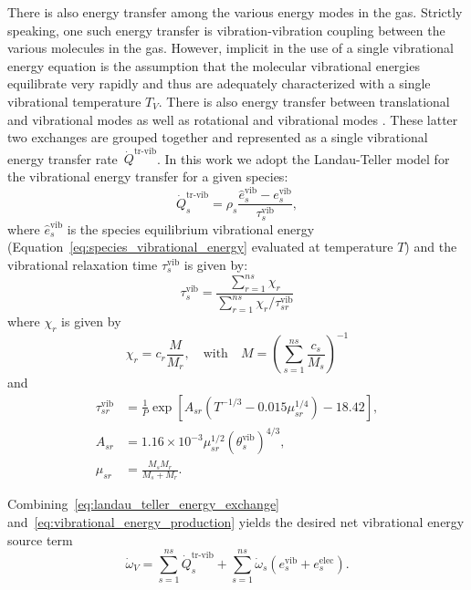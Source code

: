 \documentclass[10pt]{article}
\newcommand{\vib}{\text{vib}}
\begin{document}
There is also energy transfer among the various energy modes in the gas.  Strictly speaking, one such energy transfer is vibration-vibration coupling between the various molecules in the gas.  However, implicit in the use of a single vibrational energy equation is the assumption that the molecular vibrational energies equilibrate very rapidly and thus are adequately characterized with a single vibrational temperature $T_V$.  There is also energy transfer between translational and vibrational modes as well as rotational and vibrational modes \citep{Kirk2009}.  These latter two exchanges are grouped together and represented as a single vibrational energy transfer rate~$\dot{Q}^{\text{tr-vib}}$.  
In this work we adopt the Landau-Teller model for the vibrational energy transfer for a given species:
\begin{equation}
  \label{eq:landau_teller_energy_exchange}
  \dot{Q}^{\text{tr-vib}}_s = \rho_s \frac{\hat{e}^{\text{vib}}_{s} - e^{\text{vib}}_s}{\tau^{\text{vib}}_s},
\end{equation}
where $\hat{e}^{\text{vib}}_{s}$ is the species equilibrium vibrational energy (Equation~\eqref{eq:species_vibrational_energy} evaluated at temperature $T$) and the vibrational relaxation time $\tau^{\text{vib}}_s$ is given by:
\begin{equation}
  \tau^{\text{vib}}_s = \frac{\sum_{r=1}^{ns} \chi_r}{\sum_{r=1}^{ns} \chi_r/\tau^{\text{vib}}_{sr}}
\end{equation}
where $\chi_r$ is given by
\begin{equation}
  \label{eq:chi_definition}
  \chi_r = c_r\frac{M}{M_r},\quad \mbox{with}\quad M=\left(\sum_{s=1}^{ns}\frac{c_s}{M_s}\right)^{-1}
\end{equation}
and
\begin{align}
  \label{eq:tau_vib_sr}
  \tau^{\text{vib}}_{sr} &=  \frac{1}{P} \exp\left[A_{sr}\left(T^{-1/3} - 0.015 \mu^{1/4}_{sr}\right) - 18.42\right] ,\\
          A_{sr} &= 1.16\times 10^{-3} \mu^{1/2}_{sr}(\theta_{s}^\vib)^{4/3} ,\\
        \mu_{sr} &= \frac{M_s M_r}{M_s + M_r}.
\end{align}


Combining~\eqref{eq:landau_teller_energy_exchange} and~\eqref{eq:vibrational_energy_production} yields the desired net vibrational energy source term
\begin{equation}
  \dot{\omega}_V = \sum_{s=1}^{ns} \dot{Q}^{\text{tr-vib}}_s + \sum_{s=1}^{ns} \dot{\omega}_s\left(e^{\text{vib}}_{s} + e^{\text{elec}}_{s}\right).
\end{equation}
\end{document}
